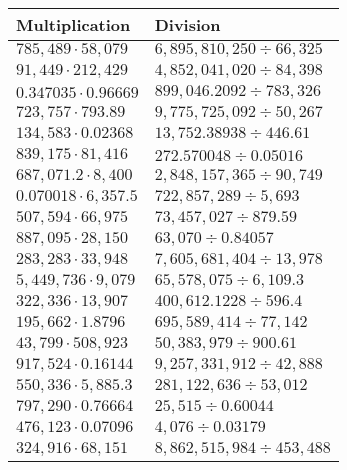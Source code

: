 \begin{longtable}[]{@{}ll@{}}
\toprule
Multiplication & Division\tabularnewline
\midrule
\endhead
\(785,489\cdot58,079\) & \(6,895,810,250÷66,325\)\tabularnewline
\(91,449\cdot212,429\) & \(4,852,041,020÷84,398\)\tabularnewline
\(0.347035\cdot0.96669\) & \(899,046.2092÷783,326\)\tabularnewline
\(723,757\cdot793.89\) & \(9,775,725,092÷50,267\)\tabularnewline
\(134,583\cdot0.02368\) & \(13,752.38938 ÷446.61\)\tabularnewline
\(839,175\cdot81,416\) & \(272.570048÷0.05016\)\tabularnewline
\(687,071.2\cdot8,400\) & \(2,848,157,365÷90,749\)\tabularnewline
\(0.070018\cdot6,357.5\) & \(722,857,289÷5,693\)\tabularnewline
\(507,594\cdot66,975\) & \(73,457,027÷879.59\)\tabularnewline
\(887,095\cdot28,150\) & \(63,070÷0.84057\)\tabularnewline
\(283,283\cdot33,948\) & \(7,605,681,404÷13,978\)\tabularnewline
\(5,449,736\cdot9,079\) & \(65,578,075÷6,109.3\)\tabularnewline
\(322,336\cdot13,907\) & \(400,612.1228 ÷596.4\)\tabularnewline
\(195,662\cdot1.8796\) & \(695,589,414÷77,142\)\tabularnewline
\(43,799\cdot508,923\) & \(50,383,979÷900.61\)\tabularnewline
\(917,524\cdot0.16144\) & \(9,257,331,912÷42,888\)\tabularnewline
\(550,336\cdot5,885.3\) & \(281,122,636÷53,012\)\tabularnewline
\(797,290\cdot0.76664\) & \(25,515÷0.60044\)\tabularnewline
\(476,123\cdot0.07096\) & \(4,076÷0.03179\)\tabularnewline
\(324,916\cdot68,151\) & \(8,862,515,984÷453,488\)\tabularnewline
\bottomrule
\end{longtable}
